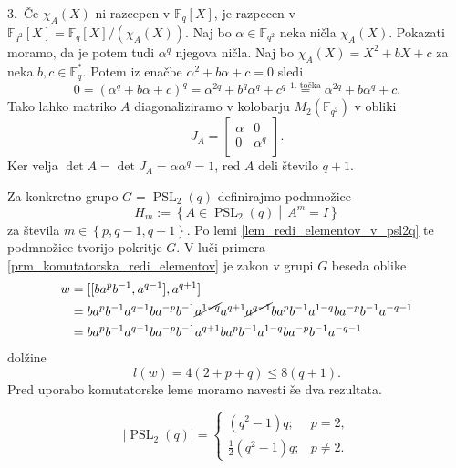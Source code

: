 \begin{dokaz}
    3.~Če $\chi_A(X)$ ni razcepen v $\mathbb{F}_q[X]$, je razpecen v  $\mathbb{F}_{q^2}[X] = \mathbb{F}_q[X] / (\chi_A(X))$. Naj bo $\alpha \in \mathbb{F}_{q^2}$ neka ničla $\chi_A(X)$. Pokazati moramo, da je potem tudi $\alpha^q$ njegova ničla.
    Naj bo $\chi_A(X) = X^2 + bX + c$ za neka $b ,c \in \mathbb{F}_q^{*}$. Potem iz enačbe $\alpha^2 + b \alpha + c  = 0$ sledi \begin{equation*}
    0 = (\alpha^{q} + b \alpha + c)^q =  \alpha^{2q} + b^{q} \alpha^{q} + c^{q} \stackrel{\text{1.~točka}}{=} \alpha^{2q} + b \alpha^{q} + c.    
    \end{equation*}  
    Tako lahko matriko $A$ diagonaliziramo v kolobarju $M_2(\mathbb{F}_{q^2})$ v obliki \begin{equation*}
    J_A = \begin{bmatrix}
        \alpha & 0\\
        0 & \alpha^{q}\\
    \end{bmatrix}.
    \end{equation*}  
    Ker velja $\det A = \det J_A  = \alpha \alpha^{q} = 1$, red $A$ deli število $q + 1$. 
\end{dokaz}
    Za konkretno grupo $G = \operatorname{PSL}_2(q)$ definirajmo podmnožice \begin{equation*}
        H_m := \left\{ A \in \operatorname{PSL}_2(q)  \middle|\,  A^{m} = I \right\}
    \end{equation*}  
       za števila $m \in \left\{ p, q-1 , q+1\right\}$.
    Po lemi \ref{lem_redi_elementov_v_psl2q} te podmnožice tvorijo pokritje $G$. V luči primera \ref{prm_komutatorska_redi_elementov} je zakon v grupi $G$ beseda oblike \begin{align*}
        w &= [[b a^{p} b^{-1}, a^{q-1}], a^{q + 1}]  \\
         &= b a^{p} b^{-1} a^{q-1} b a^{-p} b^{-1} \cancel{ a^{1 - q}} a^{q + 1} \cancel{a^{q -1}} b a^{p} b^{-1} a^{1 - q} b a^{-p} b^{-1} a^{- q - 1} \\ 
         &= b a^{p} b^{-1} a^{q-1} b a^{-p} b^{-1}  a^{q + 1}  b a^{p} b^{-1} a^{1 - q} b a^{-p} b^{-1} a^{- q - 1} 
    \end{align*}  
    dolžine \begin{equation*} 
    l(w) = 4(2 + p + q) \le 8(q + 1). 
    \end{equation*}
    Pred uporabo komutatorske leme moramo navesti še dva rezultata.
    \begin{lema}
    \label{lem_velikost_grupe_psl2q}
    \begin{equation*}
        \lvert \operatorname{PSL}_2(q) \rvert   = \begin{cases}
            (q^2 - 1) q; & p = 2,  \\
            \frac{1}{2} (q^2 - 1) q ; & p \neq 2.
        \end{cases}
     \end{equation*} 
    \end{lema}
